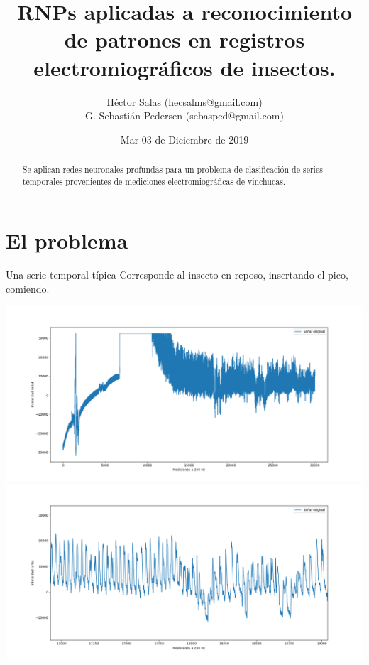 \documentclass[presentation,9pt]{beamer}
\title[RNP series temp.] %
{RNPs aplicadas a reconocimiento de patrones en registros electromiográficos de insectos.}
\author[HS, SP]
{Héctor Salas (\small hecsalms@gmail.com)\\ 
G. Sebastián Pedersen (\small sebasped@gmail.com)}%
\date[] %
{Mar 03 de Diciembre de 2019\\ 
}
\begin{document}
\begin{frame}
  \titlepage
  \vspace{-.5cm}
  \begin{abstract}
  	{Se aplican redes neuronales profundas para un problema de clasificación de series temporales provenientes de mediciones electromiográficas  de vinchucas.}
  \end{abstract}
  
\end{frame}




\section{El problema}

\begin{frame}{Una serie temporal típica}
	Corresponde al insecto en reposo, insertando el pico, comiendo.

	\includegraphics[width=.8\textwidth]{./senialOrig.png}
	\includegraphics[width=.8\textwidth]{./senial2Orig.png}

\end{frame}
\end{document}
